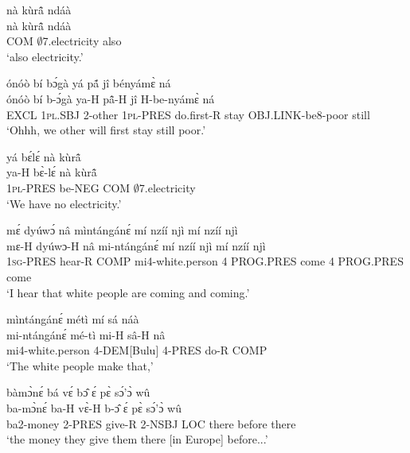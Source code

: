 \begin{exe} 
\exC\label{152} 
  \glll nà kùrã̂ ndáà \\
       nà kùrã̂ ndáà \\
         COM $\emptyset$7.electricity also   \\
    \trans `also electricity.'
\end{exe}

\begin{exe} 
\exC\label{153} 
  \glll  ónóò bí bɔ́gà yá pã́ jî bényámɛ̀ ná \\
         ónóò bí b-ɔ́gà ya-H pã̂-H jî H-be-nyámɛ̀ ná \\
         EXCL 1\textsc{pl}.SBJ 2-other 1\textsc{pl}-PRES do.first-R stay OBJ.LINK-be8-poor still \\
    \trans `Ohhh, we other will first stay still poor.'
\end{exe}

\begin{exe} 
\exC\label{154}
  \glll  yá bɛ́lɛ́ nà kùrã̂ \\
         ya-H bɛ̀-lɛ́ nà kùrã̂ \\
          1\textsc{pl}-PRES be-NEG COM $\emptyset$7.electricity   \\
    \trans `We have no electricity.'
\end{exe}

\begin{exe} 
\exC\label{155} 
  \glll  mɛ́ dyúwɔ́ nâ mìntángánɛ́ mí nzíí njì mí nzíí njì \\
       mɛ-H dyúwɔ-H nâ mi-ntángánɛ́ mí nzíí njì mí nzíí njì \\
         1\textsc{sg}-PRES hear-R COMP mi4-white.person 4 PROG.PRES come 4 PROG.PRES come   \\
    \trans `I hear that white people are coming and coming.'
\end{exe}

\begin{exe} 
\exC\label{156} 
  \glll  mìntángánɛ́ métì mí sá náà  \\
         mi-ntángánɛ́ mé-tì mi-H sâ-H nâ  \\
          mi4-white.person 4-DEM[Bulu] 4-PRES do-R COMP   \\
    \trans `The white people make that,'
\end{exe}

\begin{exe} 
\exC\label{157} 
  \glll  bàmɔ̀nɛ́ bá vɛ́ bɔ̂ ɛ́ pɛ̀ sɔ́'ɔ̀ wû \\
        ba-mɔ̀nɛ́ ba-H vɛ̀-H b-ɔ̂ ɛ́ pɛ̀ sɔ́'ɔ̀ wû \\
          ba2-money 2-PRES give-R 2-NSBJ LOC there before there  \\
    \trans `the money they give them there [in Europe] before...'
\end{exe}

